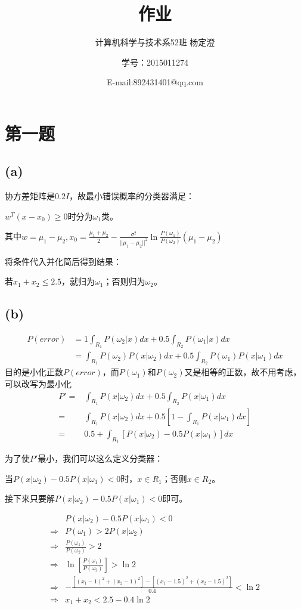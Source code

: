 \documentclass{ctexart}
\begin{document}
\title{作业}
\author{计算机科学与技术系52班 杨定澄 \and 学号：2015011274 \and E-mail:892431401@qq.com}
\date{}
\maketitle
\section*{第一题}
\subsection*{(a)}
协方差矩阵是$0.2I$，故最小错误概率的分类器满足：

$w^T(x-x_0) \ge 0$时分为$\omega_1$类。

其中$w=\mu_1-\mu_2,x_0=\frac{\mu_1+\mu_2}{2}-\frac{\sigma^2}{||\mu_1-\mu_2||^2}\ln \frac{P(\omega_1)}{P(\omega_2)}(\mu_1-\mu_2)$

将条件代入并化简后得到结果：

若$x_1+x_2 \le 2.5$，就归为$\omega_1$；否则归为$\omega_2$。
\subsection*{(b)}
\begin{align*}
P(error)&=1  \int_{R_1}P(\omega_2|x)dx+0.5  \int_{R_2}P(\omega_1|x)dx\\
		 &=\int_{R_1}P(\omega_2)P(x|\omega_2)dx+0.5  \int_{R_2}P(\omega_1)P(x|\omega_1)dx
\end{align*}
目的是小化正数$P(error)$，而$P(\omega_1)$和$P(\omega_2)$又是相等的正数，故不用考虑，可以改写为最小化
\begin{align*}
P'=&\int_{R_1}P(x|\omega_2)dx+0.5\int_{R_2}P(x|\omega_1)dx\\
  =&\int_{R_1}P(x|\omega_2)dx+0.5[1-\int_{R_1}P(x|\omega_1)dx]\\
  =&0.5+\int_{R_1}[P(x|\omega_2)-0.5P(x|\omega_1)]dx
\end{align*}

为了使$P'$最小，我们可以这么定义分类器：

当$P(x|\omega_2)-0.5P(x|\omega_1)<0$时，$x \in R_1$；否则$x \in R_2$。

接下来只要解$P(x|\omega_2)-0.5P(x|\omega_1)<0$即可。

\begin{align*}
&P(x|\omega_2)-0.5P(x|\omega_1)<0 \\
\Longrightarrow&	P(\omega_1)>2P(x|\omega_2)\\
\Longrightarrow& \frac{P(\omega_1)}{P(\omega_2)}>2 \\
\Longrightarrow& \ln[\frac{P(\omega_1)}{P(\omega_2)}]>\ln2\\
\Longrightarrow& -\frac{[(x_1-1)^2+(x_2-1)^2]-[(x_1-1.5)^2+(x_2-1.5)^2]}{0.4}<\ln2\\
\Longrightarrow& x_1+x_2<2.5-0.4\ln2
\end{align*}
\end{document}
